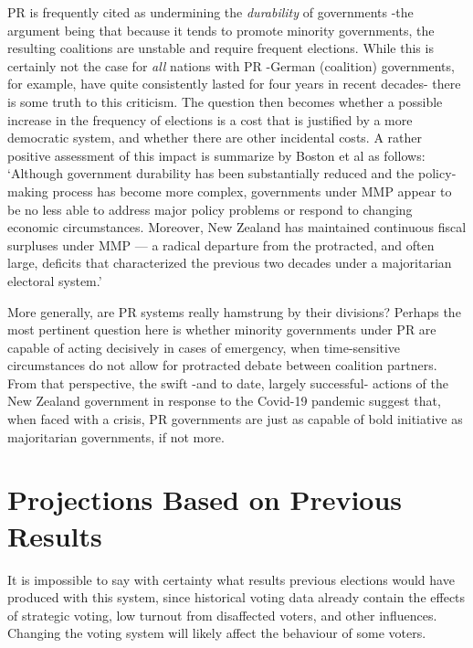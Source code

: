 PR is frequently cited as undermining the \emph{durability} of governments \--the argument being that because it tends to promote minority governments, the resulting coalitions are unstable and require frequent elections.
While this is certainly not the case for \emph{all} nations with PR \--German (coalition) governments, for example, have quite consistently lasted for four years in recent decades\-- there is some truth to this criticism.
The question then becomes whether a possible increase in the frequency of elections is a cost that is justified by a more democratic system, and whether there are other incidental costs.
A rather positive assessment of this impact is summarize by Boston et al as follows:
`Although government durability has been substantially reduced and the policy‐making process has become more complex, governments under MMP appear to be no less able to address major policy problems or respond to changing economic circumstances. Moreover, New Zealand has maintained continuous fiscal surpluses under MMP — a radical departure from the protracted, and often large, deficits that characterized the previous two decades under a majoritarian electoral system.'\citep{Boston}

More generally, are PR systems really hamstrung by their divisions? Perhaps the most pertinent question here is whether minority governments under PR are capable of acting decisively in cases of emergency, when time-sensitive circumstances do not allow for protracted debate between coalition partners.
From that perspective, the swift \--and to date, largely successful\-- actions of the New Zealand government in response to the Covid-19 pandemic suggest that, when faced with a crisis, PR governments are just as capable of bold initiative as majoritarian governments, if not more.


\section{Projections Based on Previous Results}
\label{sec:projections}

It is impossible to say with certainty what results previous elections would have produced with this system, since historical voting data already contain the effects of strategic voting, low turnout from disaffected voters, and other influences. Changing the voting system will likely affect the behaviour of some voters.

